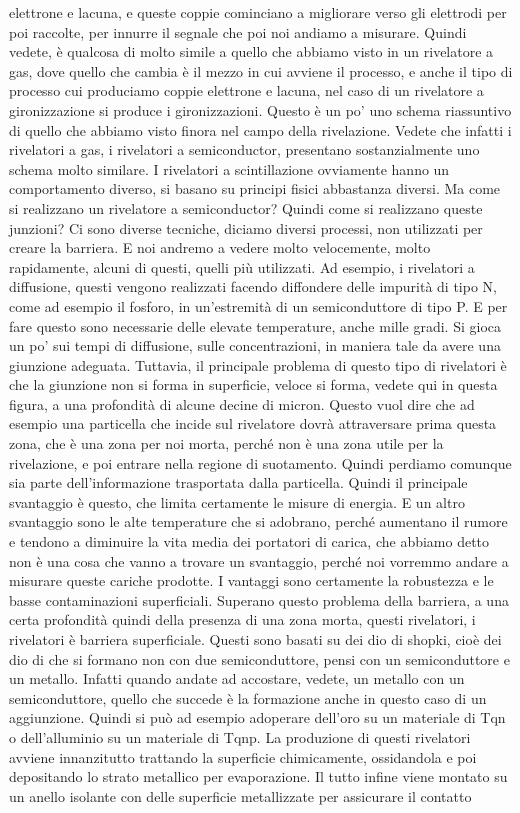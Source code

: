 {elettrone e lacuna, e queste coppie cominciano a migliorare verso gli elettrodi per poi raccolte, per innurre il segnale che poi noi andiamo a misurare. Quindi vedete, è qualcosa di molto simile a quello che abbiamo visto in un rivelatore a gas, dove quello che cambia è il mezzo in cui avviene il processo, e anche il tipo di processo cui produciamo coppie elettrone e lacuna, nel caso di un rivelatore a gironizzazione si produce i gironizzazioni. Questo è un po' uno schema riassuntivo di quello che abbiamo visto finora nel campo della rivelazione. Vedete che infatti i rivelatori a gas, i rivelatori a semiconductor, presentano sostanzialmente uno schema molto similare. I rivelatori a scintillazione ovviamente hanno un comportamento diverso, si basano su principi fisici abbastanza diversi. Ma come si realizzano un rivelatore a semiconductor? Quindi come si realizzano queste junzioni? Ci sono diverse tecniche, diciamo diversi processi, non utilizzati per creare la barriera. E noi andremo a vedere molto velocemente, molto rapidamente, alcuni di questi, quelli più utilizzati. Ad esempio, i rivelatori a diffusione, questi vengono realizzati facendo diffondere delle impurità di tipo N, come ad esempio il fosforo, in un'estremità di un semiconduttore di tipo P. E per fare questo sono necessarie delle elevate temperature, anche mille gradi. Si gioca un po' sui tempi di diffusione, sulle concentrazioni, in maniera tale da avere una giunzione adeguata. Tuttavia, il principale problema di questo tipo di rivelatori è che la giunzione non si forma in superficie, veloce si forma, vedete qui in questa figura, a una profondità di alcune decine di micron. Questo vuol dire che ad esempio una particella che incide sul rivelatore dovrà attraversare prima questa zona, che è una zona per noi morta, perché non è una zona utile per la rivelazione, e poi entrare nella regione di suotamento. Quindi perdiamo comunque sia parte dell'informazione trasportata dalla particella. Quindi il principale svantaggio è questo, che limita certamente le misure di energia. E un altro svantaggio sono le alte temperature che si adobrano, perché aumentano il rumore e tendono a diminuire la vita media dei portatori di carica, che abbiamo detto non è una cosa che vanno a trovare un svantaggio, perché noi vorremmo andare a misurare queste cariche prodotte. I vantaggi sono certamente la robustezza e le basse contaminazioni superficiali. Superano questo problema della barriera, a una certa profondità quindi della presenza di una zona morta, questi rivelatori, i rivelatori è barriera superficiale. Questi sono basati su dei dio di shopki, cioè dei dio di che si formano non con due semiconduttore, pensi con un semiconduttore e un metallo. Infatti quando andate ad accostare, vedete, un metallo con un semiconduttore, quello che succede è la formazione anche in questo caso di un aggiunzione. Quindi si può ad esempio adoperare dell'oro su un materiale di Tqn o dell'alluminio su un materiale di Tqnp. La produzione di questi rivelatori avviene innanzitutto trattando la superficie chimicamente, ossidandola e poi depositando lo strato metallico per evaporazione. Il tutto infine viene montato su un anello isolante con delle superficie metallizzate per assicurare il contatto 

}
